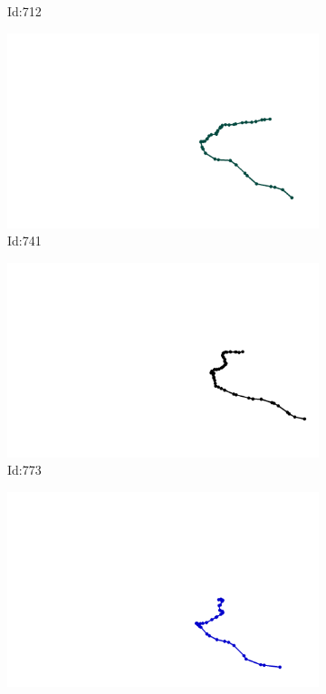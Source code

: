 \documentclass[12pt,twoside]{report}
\begin{document}
\begin{figure}
\begin{subfigure}[b]{0.20\textwidth}
\caption{Id:712}
\end{subfigure}
\begin{subfigure}[b]{0.20\textwidth}
\centering
\includegraphics[width=\textwidth]{../trajectories/741.png}
\caption{Id:741}
\end{subfigure}
\begin{subfigure}[b]{0.20\textwidth}
\centering
\includegraphics[width=\textwidth]{../trajectories/773.png}
\caption{Id:773}
\end{subfigure}
\begin{subfigure}[b]{0.20\textwidth}
\centering
\includegraphics[width=\textwidth]{../trajectories/798.png}

\end{subfigure}
\end{figure}
\end{document}
